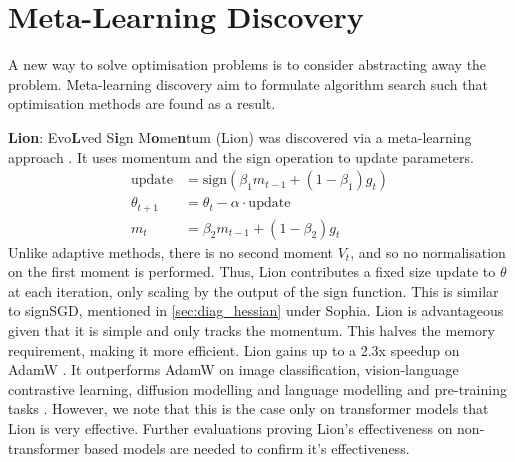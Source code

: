 \section{Meta-Learning Discovery}
A new way to solve optimisation problems is to consider abstracting away the problem. Meta-learning discovery aim to formulate algorithm search such that optimisation methods are found as a result.

\textbf{Lion}: Evo\textbf{L}ved S\textbf{i}gn M\textbf{o}me\textbf{n}tum (Lion) was discovered via a meta-learning approach \citep{chen2024symbolic}. It uses momentum and the sign operation to update parameters.
\begin{align}
    \text{update} &= \text{sign}(\beta_1 m_{t-1} + (1 - \beta_1)g_t) \\ 
    \theta_{t+1} &= \theta_t - \alpha \cdot \text{update} \\ 
    m_t &= \beta_2 m_{t-1} + (1 - \beta_2)g_t
\end{align}
Unlike adaptive methods, there is no second moment $V_t$, and so no normalisation on the first moment is performed. Thus, Lion contributes a fixed size update to $\theta$ at each iteration, only scaling by the output of the $\text{sign}$ function. This is similar to signSGD, mentioned in \cref{sec:diag_hessian} under Sophia. Lion is advantageous given that it is simple and only tracks the momentum. This halves the memory requirement, making it more efficient. Lion gains up to a 2.3x speedup on AdamW \citep{chen2024symbolic}. It outperforms AdamW on image classification, vision-language contrastive learning, diffusion modelling and language modelling and pre-training tasks \citep{chen2024symbolic}. However, we note that this is the case only on transformer models that Lion is very effective. Further evaluations proving Lion's effectiveness on non-transformer based models are needed to confirm it's effectiveness.